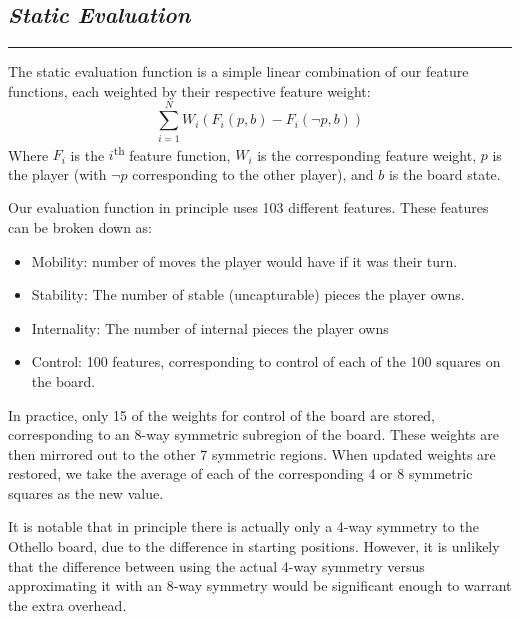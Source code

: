 \documentclass[10pt]{report}
\begin{document}
\begin{multicols}{2}
\section*{\emph{Static Evaluation}}
\hrule
The static evaluation function is a simple linear combination of our feature functions, each weighted by their respective feature weight:
\[
	\sum_{i=1}^N W_i \left(F_i(p,b) -F_i(\neg p,b) \right)
\]
Where $F_i$ is the $i$\textsuperscript{th} feature function, $W_i$ is the corresponding feature weight, $p$ is the player (with $\neg p$ corresponding to the other player), and $b$ is the board state.

Our evaluation function in principle uses 103 different features. These features can be broken down as:
    \begin{itemize}
  \item
    Mobility: number of moves the player would have if it was their turn.
  \item
   Stability:  The number of stable (uncapturable) pieces the player owns.
  \item
   Internality: The number of internal pieces the player owns
  \item
    Control: 100 features, corresponding to control of each of the 100 squares on the board.
  \end{itemize}

In practice, only 15 of the weights for control of the board are stored, corresponding to an 8-way symmetric subregion of the board. These weights are then mirrored out to the other 7 symmetric regions. When updated weights are restored, we take the average of each of the corresponding 4 or 8 symmetric squares as the new value.

It is notable that in principle there is actually only a 4-way symmetry to the Othello board, due to the difference in starting positions. However, it is unlikely that the difference between using the actual 4-way symmetry versus approximating it with an 8-way symmetry would be significant enough to warrant the extra overhead.


\end{multicols}
\end{document}
